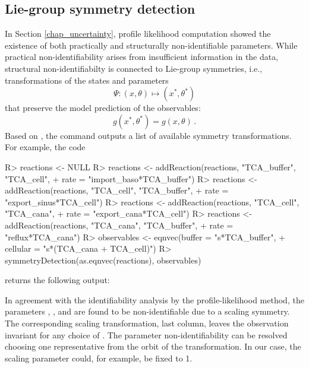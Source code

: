 \documentclass[article]{jss}
\begin{document}
\subsection{Lie-group symmetry detection}
In Section \ref{chap_uncertainty}, profile likelihood computation showed the existence of both practically and structurally non-identifiable parameters. While practical non-identifiability arises from insufficient information in the data, structural non-identifiabilty is connected to Lie-group symmetries, i.e., transformations of the states and parameters \[\Psi: (x,\theta) \longmapsto (x^*, \theta^*)\] that preserve the model prediction of the observables: \[g(x^*, \theta^*) = g(x,\theta)\,.\] Based on \cite{merkt2015higher}, the  command outputs a list of available symmetry transformations. For example, the code
%
\begin{CodeChunk}
\begin{CodeInput}
R> reactions <- NULL
R> reactions <- addReaction(reactions, "TCA_buffer", "TCA_cell", 
+    rate = "import_baso*TCA_buffer")
R> reactions <- addReaction(reactions, "TCA_cell", "TCA_buffer", 
+    rate = "export_sinus*TCA_cell")
R> reactions <- addReaction(reactions, "TCA_cell", "TCA_cana", 
+    rate = "export_cana*TCA_cell")
R> reactions <- addReaction(reactions, "TCA_cana", "TCA_buffer", 
+    rate = "reflux*TCA_cana")
R> observables <- eqnvec(buffer = "s*TCA_buffer",
+    cellular = "s*(TCA_cana + TCA_cell)")
R> symmetryDetection(as.eqnvec(reactions), observables)
\end{CodeInput}
\end{CodeChunk}
%
returns the following output:
%
\begin{CodeChunk}
\end{CodeChunk}
%
In agreement with the identifiability analysis by the profile-likelihood method, the parameters , ,  and  are found to be non-identifiable due to a scaling symmetry. The corresponding scaling transformation, last column, leaves the observation invariant for any choice of . The parameter non-identifiability can be resolved choosing one representative from the orbit of the transformation. In our case, the scaling parameter could, for example, be fixed to 1. 
\end{document}
